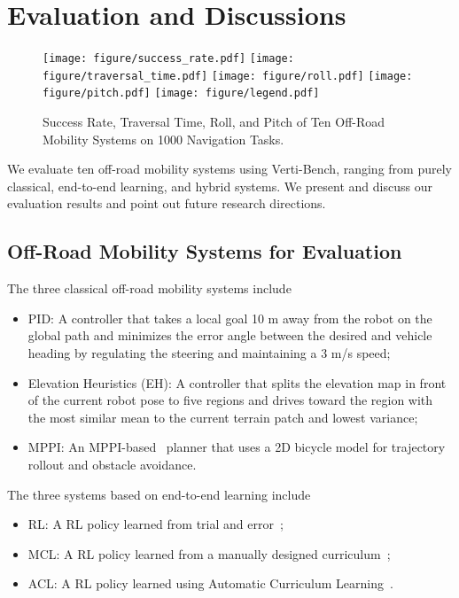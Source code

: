 \section{Evaluation and Discussions}
\label{sec::evaluation}

\begin{figure*}[t]
    \centering
    \texttt{[image: figure/success\_rate.pdf]}
    \texttt{[image: figure/traversal\_time.pdf]}
    \texttt{[image: figure/roll.pdf]}
    \texttt{[image: figure/pitch.pdf]}
    \texttt{[image: figure/legend.pdf]}
    \caption{Success Rate, Traversal Time, Roll, and Pitch of Ten Off-Road Mobility Systems on 1000 Navigation Tasks. }
    \label{fig::evaluation}
\end{figure*}

We evaluate ten off-road mobility systems using Verti-Bench, ranging from purely classical, end-to-end learning, and hybrid systems. We present and discuss our evaluation results and point out future research directions. 

\subsection{Off-Road Mobility Systems for Evaluation}
The three classical off-road mobility systems include
\begin{itemize}
    \item PID: A controller that takes a local goal 10 m away from the robot on the global path and minimizes the error angle between the desired and vehicle heading by regulating the steering and maintaining a 3 m/s speed;
    \item Elevation Heuristics (EH): A controller that splits the elevation map in front of the current robot pose to five regions and drives toward the region with the most similar mean to the current terrain patch and lowest variance; 
    \item MPPI: An MPPI-based~\cite{williams2017model} planner that uses a 2D bicycle model for trajectory rollout and obstacle avoidance. 
\end{itemize}

The three systems based on end-to-end learning include
\begin{itemize}
    \item RL: A RL policy learned from trial and error~\cite{xu2024reinforcement}; 
    \item MCL: A RL policy learned from a manually designed curriculum~\cite{xu2024reinforcement};
    \item ACL: A RL policy learned using Automatic Curriculum Learning~\cite{xu2024verti}. 
\end{itemize}

